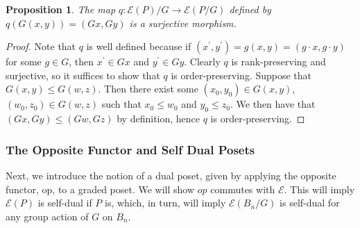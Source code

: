 \documentclass[10 pt]{amsart}
\theoremstyle{plain}
\newtheorem{prop}[thm]{Proposition}
\theoremstyle{definition}
\theoremstyle{remark}
\numberwithin{equation}{section}
\newcommand\sssec{\subsubsection}
\newcommand\rk{\operatorname{rk}}
\begin{document}
\begin{prop}\label{prop:surjection_between_F_quotients}
The map $q\colon \mathcal E(P)/G\rightarrow \mathcal E(P/G)$ defined by $q(G(x, y)) = (Gx,Gy)$ is a surjective morphism.
\end{prop}

\begin{proof}



Note that $q$ is well defined because if $(x^\prime, y^\prime) = g(x, y) = (g\cdot x, g\cdot y)$ for some $g\in G$, then $x^\prime\in Gx$ and $y^\prime\in Gy$.  Clearly $q$ is rank-preserving and surjective, so it suffices to show that $q$ is order-preserving.  Suppose that $G(x, y) \le G(w, z)$.  Then there exist some $(x_0, y_0)\in G(x, y)$, $(w_0, z_0)\in G(w, z)$ such that $x_0\le w_0$ and $y_0\le z_0$.  We then have that $(Gx, Gy) \le (Gw, Gz)$ by definition, hence $q$ is order-preserving.
\end{proof}

\sssec{The Opposite Functor and Self Dual Posets}

Next, we introduce the notion of a dual poset, given by applying the opposite functor, op, to a graded poset. We will show $op$ commutes with $\mathcal E.$ This will imply $\mathcal E(P)$ is self-dual if $P$ is, which, in turn, will imply $\mathcal E(B_n/G)$ is self-dual for any group action of $G$ on $B_n$.
\end{document}
